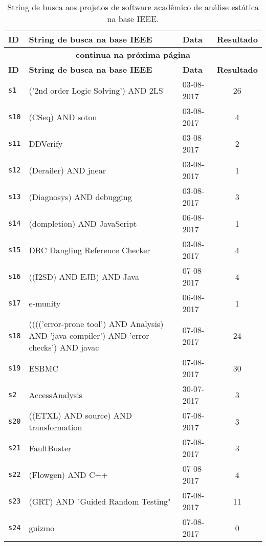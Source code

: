 \begin{longtable}{| l | p{13cm} | l | c |}
  \caption{String de busca aos projetos de software acadêmico de análise estática na base IEEE.}
  \label{search-strings-table-ieee} \\
  \hline
  \endfirsthead
  \hline
  \textbf{ID} & \textbf{String de busca na base IEEE} & \textbf{Data} & \textbf{Resultado} \\
  \hline
  \endhead
  \multicolumn{4}{c}{\textbf{continua na próxima página}} \\
  \hhline{----} \endfoot
  \endlastfoot
  \textbf{ID} & \textbf{String de busca na base IEEE} & \textbf{Data} & \textbf{Resultado} \\
  \hline
\texttt{s1} & ('2nd order Logic Solving') AND 2LS & 03-08-2017 & 26 \\
    \hline
\texttt{s10} & (CSeq) AND soton & 03-08-2017 & 4 \\
    \hline
\texttt{s11} & DDVerify & 03-08-2017 & 2 \\
    \hline
\texttt{s12} & (Derailer) AND jnear & 03-08-2017 & 1 \\
    \hline
\texttt{s13} & (Diagnosys) AND debugging & 03-08-2017 & 3 \\
    \hline
\texttt{s14} & (dompletion) AND JavaScript & 06-08-2017 & 1 \\
    \hline
\texttt{s15} & DRC Dangling Reference Checker & 03-08-2017 & 4 \\
    \hline
\texttt{s16} & ((I2SD) AND EJB) AND Java & 07-08-2017 & 4 \\
    \hline
\texttt{s17} & e-munity & 06-08-2017 & 1 \\
    \hline
\texttt{s18} & (((('error-prone tool') AND Analysis) AND 'java compiler') AND 'error checks') AND javac & 07-08-2017 & 24 \\
    \hline
\texttt{s19} & ESBMC & 07-08-2017 & 30 \\
    \hline
\texttt{s2} & AccessAnalysis & 30-07-2017 & 3 \\
    \hline
\texttt{s20} & ((ETXL) AND source) AND transformation & 07-08-2017 & 3 \\
    \hline
\texttt{s21} & FaultBuster & 07-08-2017 & 3 \\
    \hline
\texttt{s22} & (Flowgen) AND C++ & 07-08-2017 & 4 \\
    \hline
\texttt{s23} & (GRT) AND "Guided Random Testing" & 07-08-2017 & 11 \\
    \hline
\texttt{s24} & guizmo & 07-08-2017 & 0 \\

\end{longtable}
